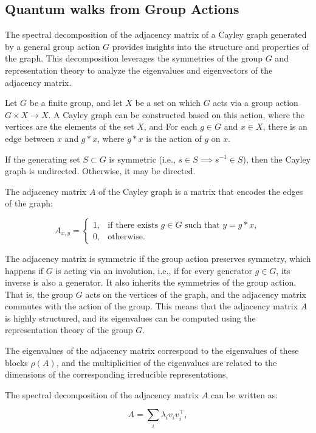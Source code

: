 \documentclass[11pt]{article}
\theoremstyle{definition}
\begin{document}
\subsection*{Quantum walks from Group Actions}
The spectral decomposition of the adjacency matrix of a Cayley graph generated by a general group action $G$ provides insights into the structure and properties of the graph. This decomposition leverages the symmetries of the group $G$ and representation theory to analyze the eigenvalues and eigenvectors of the adjacency matrix.

  
Let $G$ be a finite group, and let $X$ be a set on which $G$ acts via a group action $G \times X \to X$. A Cayley graph can be constructed based on this action, where
the vertices are the elements of the set $X$, and For each $g \in G$ and $x \in X$, there is an edge between $x$ and $g *	x$, where $g * x$ is the action of $g$ on $x$.


If the generating set $S \subset G$ is symmetric (i.e., $s \in S \implies s^{-1} \in S$), then the Cayley graph is undirected. Otherwise, it may be directed.



The adjacency matrix $A$ of the Cayley graph is a matrix that encodes the edges of the graph:

\[
A_{x,y} =
\begin{cases}
1, & \text{if there exists } g \in G \text{ such that } y = g * x, \\
0, & \text{otherwise}.
\end{cases}
\]

The adjacency matrix is symmetric if the group action preserves symmetry, which happens if $G$ is acting via an involution, i.e., if for every generator $g \in G$, its inverse is also a generator. It also inherits the symmetries of the group action. That is, the group $G$ acts on the vertices of the graph, and the adjacency matrix commutes with the action of the group. This means that the adjacency matrix $A$ is highly structured, and its eigenvalues can be computed using the representation theory of the group $G$.


The eigenvalues of the adjacency matrix correspond to the eigenvalues of these blocks $\rho(A)$, and the multiplicities of the eigenvalues are related to the dimensions of the corresponding irreducible representations.

The spectral decomposition of the adjacency matrix $A$ can be written as:

\[
A = \sum_{i} \lambda_{i} v_{i} v_{i}^{\top},
\]
\end{document}
